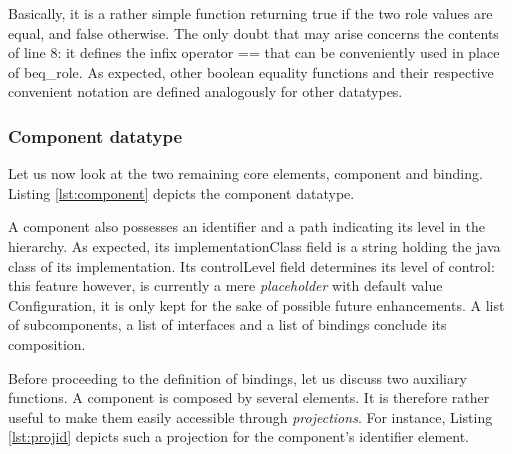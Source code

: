 	
	
	
	
	\noindent Basically, it is a rather simple function returning \textsf{true} if the two \textsf{role} values are
	equal, and \textsf{false} otherwise. The only doubt that may arise concerns the contents of line 8:
	it defines the infix operator \textsf{==} that can be conveniently used in place of
	\textsf{beq\_role}. As expected, other boolean equality functions and their respective 
	convenient notation are defined analogously for other datatypes.	
	
\subsubsection{Component datatype}

		Let us now look at the two remaining core elements, \textsf{component} and \textsf{binding}. 
	Listing \ref{lst:component} depicts the \textsf{component} datatype.   
		
	
		

		\noindent A \textsf{component} also possesses an identifier and a \textsf{path} indicating its level in the hierarchy.
		As expected, its \textsf{implementationClass} field is a string holding the java class of its implementation.	
		Its \textsf{controlLevel} field determines its level of control: this feature however, is currently a mere 
		\textit{placeholder} with default value \textsf{Configuration}, 
		it is only kept for the sake of possible future enhancements. 
		A list of sub\textsf{component}s, a list of \textsf{interface}s and a list of \textsf{binding}s conclude its
		composition. 
		 

			Before proceeding to the definition of \textsf{binding}s, let us discuss two auxiliary functions.
		A \textsf{component} is composed by several elements. It is therefore rather useful to
		make them easily accessible through \textit{projections}.	For instance, Listing \ref{lst:projid}
		depicts such a projection for the \textsf{component}'s \textsf{identifier} element.
							
		

